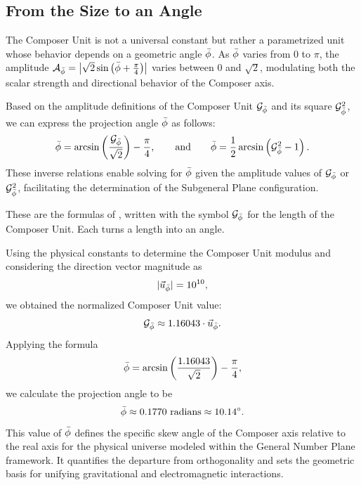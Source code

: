 \subsection{From the Size to an Angle}\label{subsec:cu-angle}

The Composer Unit is not a universal constant but rather a pa\-ram\-e\-trized unit whose behavior depends on a geometric angle $\bar{\phi}$. As $\bar{\phi}$ varies from $0$ to $\pi$, the amplitude $\mathcal{A}_{\bar{\phi}} = \left|\sqrt{2}\sin\left(\bar{\phi} + \frac{\pi}{4}\right)\right|$ varies between $0$ and $\sqrt{2}$, modulating both the scalar strength and directional behavior of the Composer axis.

\begin{remark}\label{rem:angle-expressions}
Based on the amplitude definitions of the Composer Unit $\mathcal{G}_{\bar{\phi}}$ and its square $\mathcal{G}_{\bar{\phi}}^2$, we can express the projection angle $\bar{\phi}$ as follows:
\[
\bar{\phi} = \arcsin\left(\frac{\mathcal{G}_{\bar{\phi}}}{\sqrt{2}}\right) - \frac{\pi}{4}, \qquad \text{and} \qquad \bar{\phi} = \frac{1}{2}\arcsin\left(\mathcal{G}_{\bar{\phi}}^2 - 1\right).
\]
These inverse relations enable solving for $\bar{\phi}$ given the amplitude values of $\mathcal{G}_{\bar{\phi}}$ or $\mathcal{G}_{\bar{\phi}}^2$, facilitating the determination of the Subgeneral Plane configuration.
\end{remark}

\begin{plainwords}
These are the formulas of , written with the symbol $\mathcal{G}_{\bar{\phi}}$ for the length of the Composer Unit. Each turns a length into an angle.
\end{plainwords}


\begin{remark}\label{rem:angle-value}
Using the physical constants to determine the Composer Unit modulus and considering the direction vector magnitude as
\[
|\vec{u}_{\bar{\phi}}| = 10^{10},
\]
we obtained the normalized Composer Unit value:
\[
\mathcal{G}_{\bar{\phi}} \approx 1.16043 \cdot \vec{u}_{\bar{\phi}} .
\]
Applying the formula
\[
\bar{\phi} = \arcsin\left(\frac{1.16043}{\sqrt{2}}\right) - \frac{\pi}{4},
\]
we calculate the projection angle to be
\[
\bar{\phi} \approx 0.1770 \text{ radians} \approx 10.14^\circ .
\]
This value of $\bar{\phi}$ defines the specific skew angle of the Composer axis relative to the real axis for the physical universe modeled within the General Number Plane framework. It quantifies the departure from orthogonality and sets the geometric basis for unifying gravitational and electromagnetic interactions.
\end{remark}

